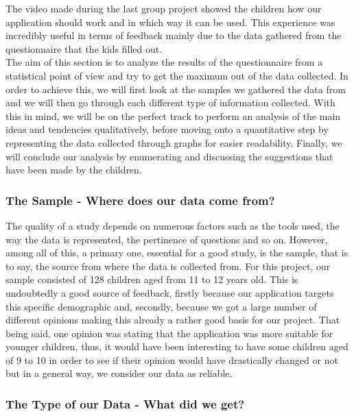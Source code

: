 \documentclass[12pt]{scrartcl}
\begin{document}
		The video made during the last group project showed the children how our application should work and in which way it can be used. This experience was incredibly useful in terms of feedback mainly due to the data gathered from the questionnaire that the kids filled out. \\

The aim of this section is to analyze the results of the questionnaire from a statistical point of view and try to get the maximum out of the data collected. In order to achieve this, we will first look at the samples we gathered the data from and we will then go through each different type of information collected. With this in mind, we will be on the perfect track to perform an analysis of the main ideas and tendencies qualitatively, before moving onto a quantitative step by representing the data collected through graphs for easier readability. Finally, we will conclude our analysis by enumerating and discussing the suggestions that have been made by the children. 

		\subsubsection*{The Sample - Where does our data come from?}
		
		The quality of a study depends on numerous factors such as the tools used, the way the data is represented, the pertinence of questions and so on. However, among all of this, a primary one, essential for a good study, is the sample, that is to say, the source from where the data is collected from. For this project, our sample consisted of 128 children aged from 11 to 12 years old. This is undoubtedly a good source of feedback, firstly because our application targets this specific demographic and, secondly, because we got a large number of different opinions making this already a rather good basis for our project. That being said, one opinion was stating that the application was more suitable for younger children, thus, it would have been interesting to have some children aged of 9 to 10 in order to see if their opinion would have drastically changed or not but in a general way, we consider our data as reliable. 
		
		\subsubsection*{The Type of our Data - What did we get?}
		
\end{document}
